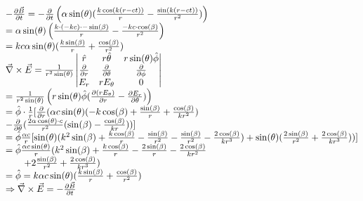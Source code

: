 \documentclass[14pt]{extarticle}
\makeatletter
\newenvironment{lefteqs}{%
    \begin{english}%
    \begin{flushleft}%
    \renewcommand{\arraystretch}{1.3}%
    $\begin{array}{@{}l@{}}%
}{%
    \end{array}$%
    \end{flushleft}%
    \end{english}%
}
\makeatother
\begin{document}
\begin{lefteqs}
    -\frac{\partial \vec{B}}{\partial t} = -\frac{\partial}{\partial t} \left( \alpha \sin(\theta)(\frac{k\cos(k(r-ct))}{r} - \frac{\sin(k(r-ct))}{r^2}) \right) \\
    = \alpha \sin(\theta) \left( \frac{k \cdot (-kc) \cdot -\sin(\beta)}{r} - \frac{-kc \cdot \cos(\beta)}{r^2} \right) \\
    = kc \alpha \sin(\theta) (\frac{k\sin(\beta)}{r} + \frac{\cos(\beta)}{r^2}) \\
    \vec{\nabla} \times \vec{E} = \frac{1}{r^2 \sin(\theta)} \begin{vmatrix}
        \hat{r} & r\hat{\theta} & r\sin(\theta)\hat{\phi} \\
        \frac{\partial}{\partial r} & \frac{\partial}{\partial \theta} & \frac{\partial}{\partial \phi} \\
        E_r & rE_\theta & 0
    \end{vmatrix} \\
    = \frac{1}{r^2 \sin(\theta)} \left( r\sin(\theta) \hat{\phi} (\frac{\partial(rE_\theta)}{\partial r} - \frac{\partial E_r}{\partial \theta}) \right) \\
    = \hat{\phi} \cdot \frac{1}{r} [\frac{\partial}{\partial r}(\alpha c \sin(\theta)(-k \cos(\beta) + \frac{\sin(\beta)}{r} + \frac{\cos(\beta)}{kr^2})  \\
    - \frac{\partial}{\partial \theta}(\frac{2\alpha \cos(\theta) \cdot c}{r^2}(\sin(\beta) - \frac{\cos(\beta)}{kr})) ] \\
    = \hat{\phi} \frac{\alpha c}{r} [\sin(\theta)(k^2 \sin(\beta) + \frac{k\cos(\beta)}{r} - \frac{\sin(\beta)}{r^2} - \frac{\sin(\beta)}{r^2} - \frac{2\cos(\beta)}{kr^3}) + \sin(\theta)(\frac{2\sin(\beta)}{r^2} + \frac{2\cos(\beta)}{kr^3}))] \\
    = \hat{\phi} \frac{\alpha c \sin(\theta)}{r} (k^2 \sin(\beta) + \frac{k\cos(\beta)}{r} - \frac{2\sin(\beta)}{r} - \frac{2\cos(\beta)}{kr^2}\\
    \qquad + 2\frac{\sin(\beta)}{r^2} + \frac{2\cos(\beta)}{kr^3}) \\
    = \hat{\phi} = k\alpha c \sin(\theta) (\frac{k\sin(\beta)}{r} + \frac{\cos(\beta)}{r^2}) \\
    \Rightarrow \vec{\nabla} \times \vec{E} = -\frac{\partial \vec{B}}{\partial t}
\end{lefteqs}
\end{document}
